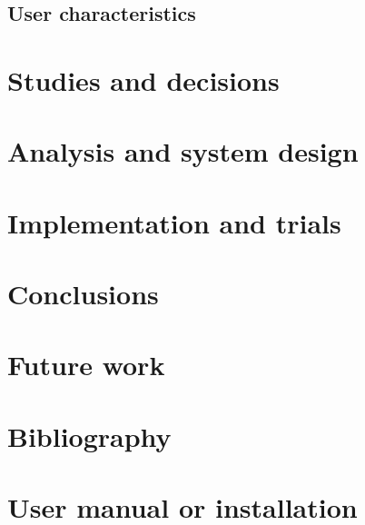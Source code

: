 \documentclass[a4paper,12pt]{book}
\begin{document}
\section{User characteristics}
\chapter{Studies and decisions}
\chapter{Analysis and system design}
\chapter{Implementation and trials}
\chapter{Conclusions}
\chapter{Future work}
\appendix
\chapter{Bibliography}
\chapter{User manual or installation}
\end{document}
